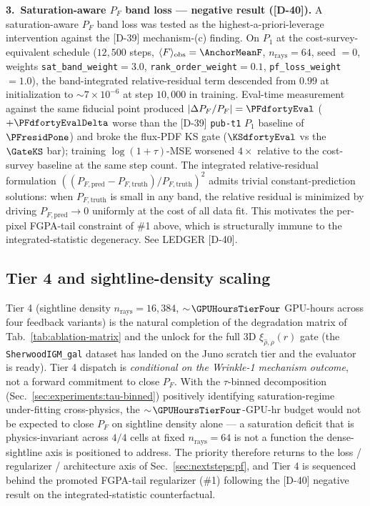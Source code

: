 \textbf{3.\ Saturation-aware $P_F$ band loss --- negative result ([D-40]).} A saturation-aware $P_F$ band loss was tested as the highest-a-priori-leverage intervention against the [D-39] mechanism-(c) finding. On $P_1$ at the cost-survey-equivalent schedule ($12{,}500$ steps, $\langle F\rangle_{\text{obs}}=\AnchorMeanF$, $n_{\text{rays}}=64$, seed $=0$, weights \texttt{sat\_band\_weight}$=3.0$, \texttt{rank\_order\_weight}$=0.1$, \texttt{pf\_loss\_weight}$=1.0$), the band-integrated relative-residual term descended from $0.99$ at initialization to $\sim\!7\times\!10^{-6}$ at step $10{,}000$ in training. Eval-time measurement against the same fiducial point produced $|\Delta P_F/P_F|=\PFdfortyEval$ ($+\PFdfortyEvalDelta$ worse than the [D-39] \texttt{pub-t1} $P_1$ baseline of $\PFresidPone$) and broke the flux-PDF KS gate ($\KSdfortyEval$ vs the $\GateKS$ bar); training $\log(1+\tau)$-MSE worsened $4\times$ relative to the cost-survey baseline at the same step count. The integrated relative-residual formulation $((P_{F,\text{pred}}-P_{F,\text{truth}})/P_{F,\text{truth}})^2$ admits trivial constant-prediction solutions: when $P_{F,\text{truth}}$ is small in any band, the relative residual is minimized by driving $P_{F,\text{pred}}\!\to\!0$ uniformly at the cost of all data fit. This motivates the per-pixel FGPA-tail constraint of \#1 above, which is structurally immune to the integrated-statistic degeneracy. See LEDGER [D-40].

\subsection{Tier 4 and sightline-density scaling}
\label{sec:nextsteps:tier4}
Tier 4 (sightline density $n_{\text{rays}}=16{,}384$, $\sim\!\GPUHoursTierFour$ GPU-hours across four feedback variants) is the natural completion of the degradation matrix of Tab.~\ref{tab:ablation-matrix} and the unlock for the full 3D $\xi_{\hat\rho,\rho}(r)$ gate (the \texttt{SherwoodIGM\_gal} dataset has landed on the Juno scratch tier and the evaluator is ready). Tier 4 dispatch is \emph{conditional on the Wrinkle-1 mechanism outcome}, not a forward commitment to close $P_F$. With the $\tau$-binned decomposition (Sec.~\ref{sec:experiments:tau-binned}) positively identifying saturation-regime under-fitting cross-physics, the $\sim\!\GPUHoursTierFour$-GPU-hr budget would not be expected to close $P_F$ on sightline density alone --- a saturation deficit that is physics-invariant across $4/4$ cells at fixed $n_{\text{rays}}=64$ is not a function the dense-sightline axis is positioned to address. The priority therefore returns to the loss / regularizer / architecture axis of Sec.~\ref{sec:nextsteps:pf}, and Tier 4 is sequenced behind the promoted FGPA-tail regularizer (\#1) following the [D-40] negative result on the integrated-statistic counterfactual.

